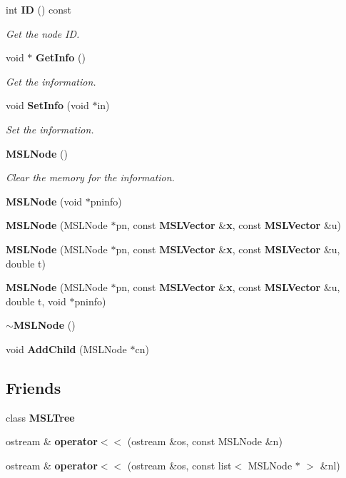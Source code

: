 \begin{CompactItemize}
int {\bf ID} () const
\begin{CompactList}\small\item\em Get the node ID.\item\end{CompactList}\item 
void $\ast$ {\bf Get\-Info} ()
\begin{CompactList}\small\item\em Get the information.\item\end{CompactList}\item 
void {\bf Set\-Info} (void $\ast$in)
\begin{CompactList}\small\item\em Set the information.\item\end{CompactList}\item 
{\bf MSLNode} ()
\begin{CompactList}\small\item\em Clear the memory for the information.\item\end{CompactList}\item 
{\bf MSLNode} (void $\ast$pninfo)
\item 
{\bf MSLNode} (MSLNode $\ast$pn, const {\bf MSLVector} \&{\bf x}, const {\bf MSLVector} \&u)
\item 
{\bf MSLNode} (MSLNode $\ast$pn, const {\bf MSLVector} \&{\bf x}, const {\bf MSLVector} \&u, double t)
\item 
{\bf MSLNode} (MSLNode $\ast$pn, const {\bf MSLVector} \&{\bf x}, const {\bf MSLVector} \&u, double t, void $\ast$pninfo)
\item 
{\bf $\sim$MSLNode} ()
\item 
void {\bf Add\-Child} (MSLNode $\ast$cn)
\end{CompactItemize}
\subsection*{Friends}
\begin{CompactItemize}
\item 
class {\bf MSLTree}
\item 
ostream \& {\bf operator$<$$<$} (ostream \&os, const MSLNode \&n)
\item 
ostream \& {\bf operator$<$$<$} (ostream \&os, const list$<$ MSLNode $\ast$ $>$ \&nl)
\end{CompactItemize}


